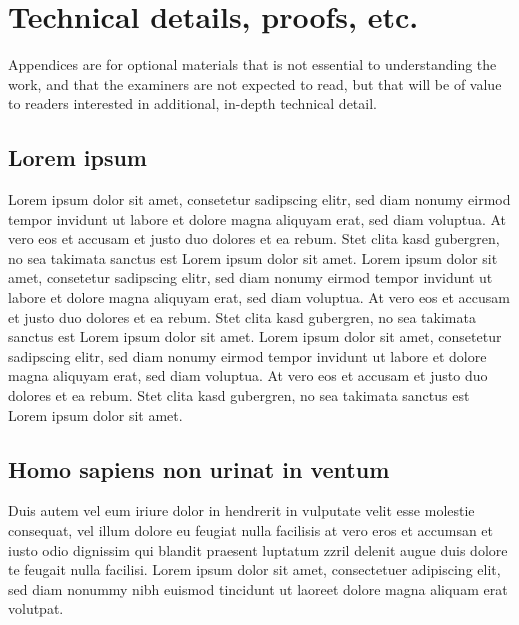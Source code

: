 \appendix

\chapter{Technical details, proofs, etc.}

Appendices are for optional materials that is not essential to
understanding the work, and that the examiners are not expected to
read, but that will be of value to readers interested in additional,
in-depth technical detail.

\section{Lorem ipsum}

Lorem ipsum dolor sit amet, consetetur sadipscing elitr, sed diam
nonumy eirmod tempor invidunt ut labore et dolore magna aliquyam erat,
sed diam voluptua. At vero eos et accusam et justo duo dolores et ea
rebum. Stet clita kasd gubergren, no sea takimata sanctus est Lorem
ipsum dolor sit amet. Lorem ipsum dolor sit amet, consetetur
sadipscing elitr, sed diam nonumy eirmod tempor invidunt ut labore et
dolore magna aliquyam erat, sed diam voluptua. At vero eos et accusam
et justo duo dolores et ea rebum. Stet clita kasd gubergren, no sea
takimata sanctus est Lorem ipsum dolor sit amet. Lorem ipsum dolor sit
amet, consetetur sadipscing elitr, sed diam nonumy eirmod tempor
invidunt ut labore et dolore magna aliquyam erat, sed diam voluptua.
At vero eos et accusam et justo duo dolores et ea rebum. Stet clita
kasd gubergren, no sea takimata sanctus est Lorem ipsum dolor sit
amet.

\section{Homo sapiens non urinat in ventum}
Duis autem vel eum iriure dolor in hendrerit in vulputate velit esse
molestie consequat, vel illum dolore eu feugiat nulla facilisis at
vero eros et accumsan et iusto odio dignissim qui blandit praesent
luptatum zzril delenit augue duis dolore te feugait nulla facilisi.
Lorem ipsum dolor sit amet, consectetuer adipiscing elit, sed diam
nonummy nibh euismod tincidunt ut laoreet dolore magna aliquam erat
volutpat.
